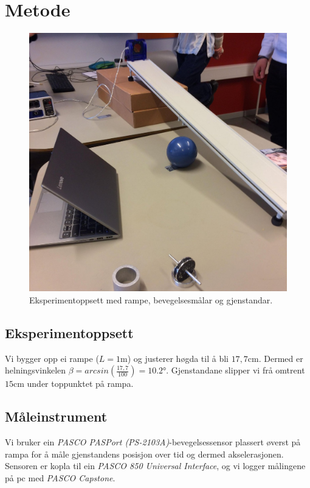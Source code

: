 \documentclass[12pt,a4paper]{article}
\begin{document}
  \section{Metode}
  \begin{figure}
    \begin{center}
      \includegraphics[scale=.1]{fylab1_oppsett.jpg}
      \caption{Eksperimentoppsett med rampe, bevegelsesmålar og gjenstandar.}
    \end{center}
  \end{figure}
  \subsection{Eksperimentoppsett}
  Vi bygger opp ei rampe ($L = 1\si{\meter}$) og justerer høgda til å bli $17,7 \si{\centi\meter}$.
  Dermed er helningsvinkelen $\beta = arcsin\left(\frac{17,7}{100} \right) = \ang{10,2}$.
  Gjenstandane slipper vi frå omtrent $15 \si{\centi\meter}$ under toppunktet på rampa.

  \subsection{Måleinstrument}
  Vi bruker ein \textit{PASCO PASPort (PS-2103A)}-bevegelsessensor plassert
  øverst på rampa for å måle gjenstandens posisjon over tid og dermed
  akselerasjonen. Sensoren er kopla til ein \textit{PASCO 850 Universal
  Interface}, og vi logger målingene på pc med \textit{PASCO Capstone}.
\end{document}
